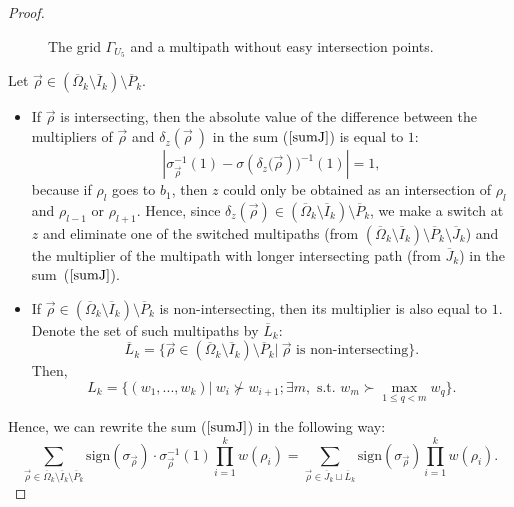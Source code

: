\documentclass{article}
\theoremstyle{plain}
\theoremstyle{definition}
\begin{document}
\begin{proof}
\begin{figure}[H]
\caption{The grid $\Gamma_{U_5}$ and a multipath without easy intersection points. }
\label{Pmultipath1preproper1}

\end{figure}

Let $\vec{\rho}\in(\overline{\Omega}_k\setminus \overline{I}_k)\setminus\overline{P}_k$.
\begin{itemize}
\item If $\vec{\rho}$ is intersecting, then the absolute value of the difference between the multipliers of
$\vec{\rho}$ and $\delta_{z}(\vec{\rho}\ )$ in the sum ($\ref{sumJ}$) is equal to $1$:
$$ |\sigma_{\vec{\rho}}^{-1}(1)-\sigma({\delta_{z}(\vec{\rho}}))^{-1}(1)|=1,$$
because if $\rho_l$ goes to $b_1$, then $z$ could only be obtained as an intersection of $\rho_l$ and $\rho_{l-1}$ or $\rho_{l+1}$. Hence, since $\delta_{z}(\vec{\rho})\in(\overline{\Omega}_k\setminus \overline{I}_k)\setminus\overline{P}_k$, we make a switch at $z$ and eliminate one of the switched multipaths (from $(\overline{\Omega}_k\setminus \overline{I}_k)\setminus\overline{P}_k\setminus\overline{J}_k$) and the multiplier of the multipath with longer intersecting path (from $\overline{J}_k$) in the sum~($\ref{sumJ}$). 

\item If $\vec{\rho}\in(\overline{\Omega}_k\setminus \overline{I}_k)\setminus\overline{P}_k$ is non-intersecting, then its multiplier is also equal to $1$. Denote the set of such multipaths by $\overline{L}_k$:
$$\overline{L}_k=\{ \vec{\rho}\in(\overline{\Omega}_k\setminus \overline{I}_k)\setminus\overline{P}_k| \  \vec{\rho} \text{ is non-intersecting}  \}.$$
Then, $$L_k=\{ (w_1,...,w_k)|\ w_i\nsucc w_{i+1}; \exists m,\text{ s.t. } w_m\succ \max\limits_{1\leq q<m}{w_q} \}.$$
\end{itemize}

Hence, we can rewrite the sum ($\ref{sumJ}$) in the following way:
\begin{equation}\label{sumK}
\sum\limits_{\vec{\rho}\in\overline{\Omega}_k\setminus \overline{I}_k\setminus\overline{P}_k}\mathrm{sign}(\sigma_{\vec{\rho}})\cdot\sigma_{\vec{\rho}}^{-1}(1)\prod\limits_{i=1}^k w(\rho_i)=\sum\limits_{\vec{\rho}\in\overline{J}_k\sqcup\overline{L}_k}\mathrm{sign}(\sigma_{\vec{\rho}})\prod\limits_{i=1}^k w(\rho_i).
\end{equation}


\end{proof}
\end{document}
